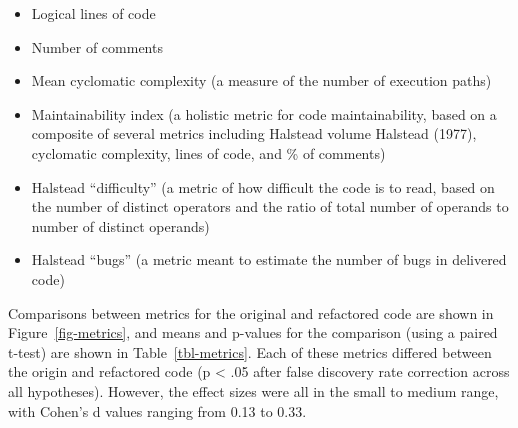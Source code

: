\documentclass[
]{article}
\providecommand{\tightlist}{%
  \setlength{\itemsep}{0pt}\setlength{\parskip}{0pt}}\usepackage{longtable,booktabs,array}
\begin{document}
\begin{itemize}
\tightlist
\item
  Logical lines of code
\item
  Number of comments
\item
  Mean cyclomatic complexity (a measure of the number of execution
  paths)
\item
  Maintainability index (a holistic metric for code maintainability,
  based on a composite of several metrics including Halstead volume
  Halstead (1977), cyclomatic complexity, lines of code, and \% of
  comments)
\item
  Halstead ``difficulty'' (a metric of how difficult the code is to
  read, based on the number of distinct operators and the ratio of total
  number of operands to number of distinct operands)
\item
  Halstead ``bugs'' (a metric meant to estimate the number of bugs in
  delivered code)
\end{itemize}

Comparisons between metrics for the original and refactored code are
shown in Figure~\ref{fig-metrics}, and means and p-values for the
comparison (using a paired t-test) are shown in Table~\ref{tbl-metrics}.
Each of these metrics differed between the origin and refactored code (p
\textless{} .05 after false discovery rate correction across all
hypotheses). However, the effect sizes were all in the small to medium
range, with Cohen's d values ranging from 0.13 to 0.33.
\end{document}

